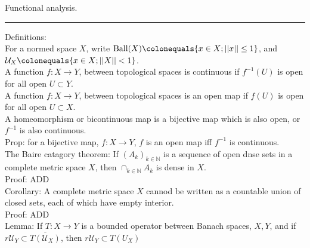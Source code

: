 \documentclass[12pt]{article}
\newcommand{\rarw}[0] { \rightarrow }
\newcommand{ \defeq }[0] { \colonequals }
\newcommand{\nats}[0] { \mathbb{N}}
\newcommand{\U}[0] { \mathcal{U} }
\newcommand{ \Ball } { \textrm{Ball} }
\begin{document}
\break

\begin{flushleft}
Functional analysis. \\
\end{flushleft}

\begin{flushleft}
\addvspace{5pt} \hrule
\end{flushleft}	



Definitions: \\


\noindent
For a normed space $X$, write $\Ball(X) \defeq \{  x \in X; ||x|| \le 1 \}$, and $\U_X \defeq \{ x \in X; ||X|| < 1 \}$. \\

\noindent
A function $f:X \rarw Y$, between topological spaces is continuous if $f^{-1}(U)$ is open for all open $U \subset Y$. \\

\noindent
A function $f:X \rarw Y$, between topological spaces is an open map if $f(U)$ is open for all open $U \subset X$. \\

\noindent
A homeomorphism or bicontinuous map is a bijective map which is also open, or $f^{-1}$ is also continuous. \\


Prop: for a bijective map, $f:X \rarw Y$, $f$ is an open map iff $f^{-1}$ is continuous. \\


The Baire catagory theorem: If $( A_k )_{k \in \nats}$ is a sequence of open dnse sets in a complete metric space $X$, then $\cap_{k \in \nats} A_k$ is dense in $X$. \\

\noindent
Proof: ADD \\


Corollary: A complete metric space $X$ cannod be written as a countable union of closed sets, each of which have empty interior. \\

\noindent
Proof: ADD \\

Lemma: If $T: X \rarw Y$ is a bounded operator between Banach spaces, $X,Y$, and if $r \U_Y \subset \overline{ T( \U_X) }$, then $r \U_Y \subset T(U_X)$ \\
\end{document}
